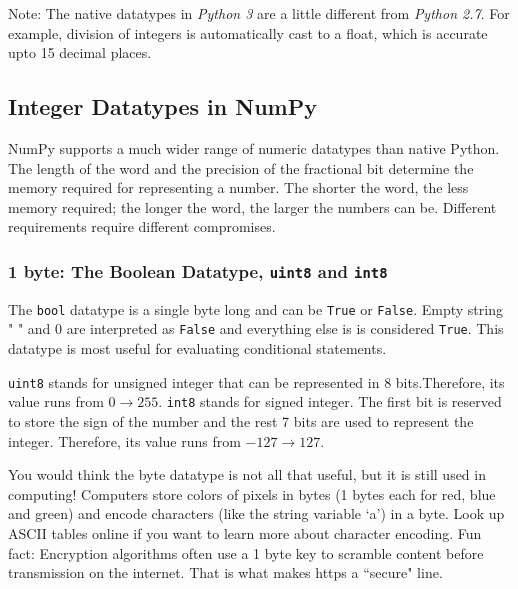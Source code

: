 \documentclass[psfig,preprint]{aastex}
\begin{document}
Note: The native datatypes in {\it Python 3} are a little different from 
{\it Python 2.7}. For example, division of integers is automatically 
cast to a float, which is accurate upto 15 decimal places.

\subsection {Integer Datatypes in NumPy}
	NumPy supports a much wider range of numeric datatypes than 
native Python. The length of the word and the precision of the fractional bit 
determine the memory required for representing a number. The shorter the word, 
the less memory required; the longer the word, the larger the numbers can be. 
Different requirements require different compromises.

\subsubsection {1 byte: The Boolean Datatype, \texttt{uint8} and \texttt{int8}}

	The \verb;bool; datatype is a single byte long and can be \verb;True; 
or \verb;False;. Empty string " " and $0$ are interpreted as \verb;False; and 
everything else is is considered \verb;True;. This datatype is most useful for
evaluating conditional statements.

	\verb;uint8; stands for unsigned integer that can be represented in 
8 bits.Therefore, its value runs from $0 \rightarrow 255$. \verb;int8; stands 
for signed integer. The first bit is reserved to store the sign of the number 
and the rest 7 bits are used to represent the integer. Therefore, its value 
runs from $-127 \rightarrow 127$.

You would think the byte datatype is not all that useful, but it is still used 
in computing! Computers store colors of pixels in bytes (1 bytes each for red, 
blue and green) and encode characters (like the string variable `a') in a byte.
Look up ASCII tables online if you want to learn more about character encoding.
Fun fact: Encryption algorithms often use a 1 byte key to scramble content 
before transmission on the internet. That is what makes https a ``secure" line.

\end{document}
